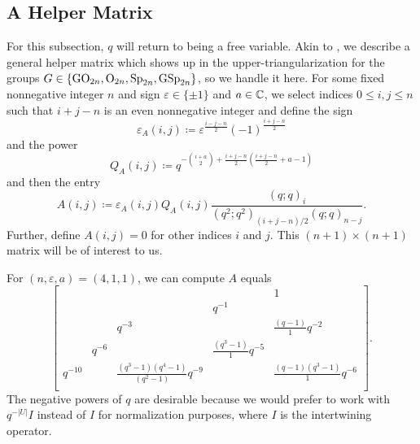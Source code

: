 \subsection{A Helper Matrix} \label{subsec:helper}
For this subsection, $q$ will return to being a free variable. Akin to , we describe a general helper matrix which shows up in the upper-triangularization for the groups $G\in\{\mathrm{GO}_{2n},\mathrm{O}_{2n},\mathrm{Sp}_{2n},\mathrm{GSp}_{2n}\}$, so we handle it here. For some fixed nonnegative integer $n$ and sign $\varepsilon\in\{\pm1\}$ and $a\in\mathbb C$, we select indices $0\le i,j\le n$ such that $i+j-n$ is an even nonnegative integer and define the sign
\[\varepsilon_A(i,j)\coloneqq\varepsilon^{\frac{i-j-n}2}(-1)^{\frac{i+j-n}2}\]
and the power
\[Q_A(i,j)\coloneqq q^{-\binom{i+a}2+\frac{i+j-n}{2}\left(\frac{i+j-n}{2}+a-1\right)}\]
and then the entry
\[A(i,j)\coloneqq\varepsilon_A(i,j)Q_A(i,j)\frac{(q;q)_i}{(q^2;q^2)_{(i+j-n)/2}(q;q)_{n-j}}.\]
Further, define $A(i,j)=0$ for other indices $i$ and $j$. This $(n+1)\times(n+1)$ matrix will be of interest to us.
\begin{example}
    For $(n,\varepsilon,a)=(4,1,1)$, we can compute $A$ equals
    \[\begin{bmatrix}  &   &   &   & 1\\  &   &   & q^{-1}\\  &   & q^{-3}  &   & \frac{ ( q - 1 ) }{1} q^{-2}\\  & q^{-6}  &   & \frac{ ( q^{3} - 1 ) }{1} q^{-5}\\q^{-10}  &   & \frac{ ( q^{3} - 1 ) ( q^{4} - 1 ) }{ ( q^{2} - 1 ) } q^{-9}  &   & \frac{ ( q - 1 ) ( q^{3} - 1 ) }{1} q^{-6}\\\end{bmatrix}.\]
    The negative powers of $q$ are desirable because we would prefer to work with $q^{-\left|U\right|}I$ instead of $I$ for normalization purposes, where $I$ is the intertwining operator.
\end{example}
